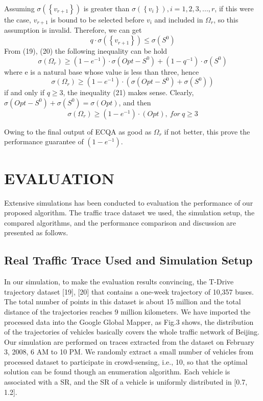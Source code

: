 \documentclass[journal]{IEEEtran}
\begin{document}
 Assuming $\sigma\left(\left \{ v_{r+1} \right \}\right)$ is greater than $\sigma\left ( \left \{ v_{i} \right \} \right),i=1,2,3,...,r$, if this were the case, $v_{r+1}$ is bound to be selected before $v_{i}$ and included in $\Omega _{r}$, so this assumption is invalid. Therefore, we can get
 \begin{equation}
 q\cdot \sigma \left ( \left \{ v_{r+1} \right \} \right )\leqslant \sigma \left ( S^{0} \right )
 \end{equation}
From (19), (20) the following inequality can be hold
\begin{equation}
\sigma \left ( \Omega _{r} \right )\geqslant \left ( 1-e^{-1} \right )\cdot \sigma (Opt-S^{0})+(1-q^{-1})\cdot \sigma (S^{0})
\end{equation}
where e is a natural base whose value is less than three, hence
\begin{equation}
\sigma \left ( \Omega _{r} \right )\geqslant \left ( 1-e^{-1} \right )\cdot (\sigma (Opt-S^{0})+\sigma (S^{0}))
\end{equation}
if and only if $q\geqslant 3$, the inequality (21) makes sense. Clearly, $\sigma(Opt-S^{0})+\sigma (S^{0})=\sigma (Opt)$, and then
\begin{equation}
\sigma(\Omega_{r})\geqslant (1-e^{-1})\cdot (Opt), \ for \ q\geqslant 3
\end{equation}

Owing to the final output of ECQA as good as $\Omega_{r}$ if not better, this prove the performance guarantee of $(1-e^{-1})$.


\section{EVALUATION}
Extensive simulations has been conducted to evaluation the performance of our proposed algorithm. The traffic trace dataset we used, the simulation setup, the compared algorithms, and the performance comparison and discussion are presented as follows.
\subsection{Real Traffic Trace Used and Simulation Setup}
In our simulation, to make the evaluation results convincing, the T-Drive trajectory dataset [19], [20] that contains a one-week trajectory of 10,357 buses. The total number of points in this dataset is about 15 million and the total distance of the trajectories reaches 9 million kilometers. We have imported the processed data into the Google Global Mapper, as Fig.3 shows, the distribution of the trajectories of vehicles basically covers the whole traffic network of Beijing. Our simulation are performed on traces extracted from the dataset on February 3, 2008, 6 AM to 10 PM. We randomly extract a small number of vehicles from processed dataset to participate in crowd-sensing, i.e., 10, so that the optimal solution can be found though an enumeration algorithm. Each vehicle is associated with a SR, and the SR of a vehicle is uniformly distributed in [0.7, 1.2].   
\end{document}
